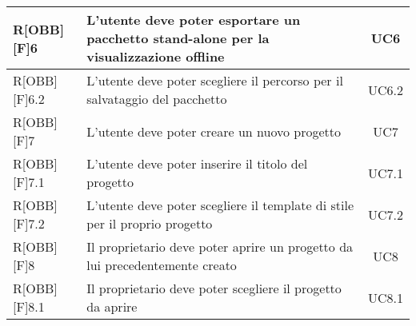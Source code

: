 \begin{center}
\begin{table}[h]
\begin{tabular}{|l|p{}|c|}
		R[OBB][F]6 & L'utente deve poter esportare un pacchetto stand-alone per la visualizzazione offline & UC6 \\ \midrule
		R[OBB][F]6.2 & L'utente deve poter scegliere il percorso per il salvataggio del pacchetto & UC6.2 \\ \midrule
		
		R[OBB][F]7 & L'utente deve poter creare un nuovo progetto & UC7 \\ \midrule
		R[OBB][F]7.1 & L'utente deve poter inserire il titolo del progetto & UC7.1 \\ \midrule
		R[OBB][F]7.2 & L'utente deve poter scegliere il template di stile per il proprio progetto & UC7.2 \\ \midrule
		
		R[OBB][F]8 & Il proprietario deve poter aprire un progetto da lui precedentemente creato & UC8 \\ \midrule
		R[OBB][F]8.1 & Il proprietario deve poter scegliere il progetto da aprire & UC8.1 \\ \midrule
		

\end{tabular}
\end{table}
\end{center}
